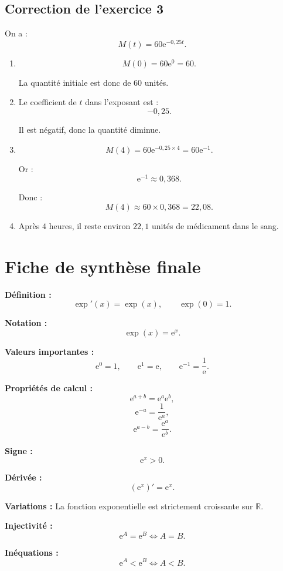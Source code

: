 \documentclass[11pt,a4paper]{article}
\newcommand{\R}{\mathbb{R}}
\newcommand{\e}{\mathrm{e}}
\begin{document}
\subsection*{Correction de l'exercice 3}

On a :
\[
M(t)=60\e^{-0,25t}.
\]

\begin{enumerate}
    \item
    \[
    M(0)=60\e^0=60.
    \]

    La quantité initiale est donc de $60$ unités.

    \item Le coefficient de $t$ dans l'exposant est :
    \[
    -0,25.
    \]

    Il est négatif, donc la quantité diminue.

    \item
    \[
    M(4)=60\e^{-0,25\times 4}=60\e^{-1}.
    \]

    Or :
    \[
    \e^{-1}\approx 0,368.
    \]

    Donc :
    \[
    M(4)\approx 60\times 0,368=22,08.
    \]

    \item Après $4$ heures, il reste environ $22,1$ unités de médicament dans le sang.
\end{enumerate}

\section{Fiche de synthèse finale}

\begin{retenir}
\textbf{Définition :}
\[
\exp'(x)=\exp(x),
\qquad
\exp(0)=1.
\]

\textbf{Notation :}
\[
\exp(x)=\e^x.
\]

\textbf{Valeurs importantes :}
\[
\e^0=1,
\qquad
\e^1=\e,
\qquad
\e^{-1}=\frac{1}{\e}.
\]

\textbf{Propriétés de calcul :}
\[
\e^{a+b}=\e^a\e^b,
\]
\[
\e^{-a}=\frac{1}{\e^a},
\]
\[
\e^{a-b}=\frac{\e^a}{\e^b}.
\]

\textbf{Signe :}
\[
\e^x>0.
\]

\textbf{Dérivée :}
\[
(\e^x)'=\e^x.
\]

\textbf{Variations :}
La fonction exponentielle est strictement croissante sur $\R$.

\textbf{Injectivité :}
\[
\e^A=\e^B \Longleftrightarrow A=B.
\]

\textbf{Inéquations :}
\[
\e^A<\e^B \Longleftrightarrow A<B.
\]
\end{retenir}
\end{document}
